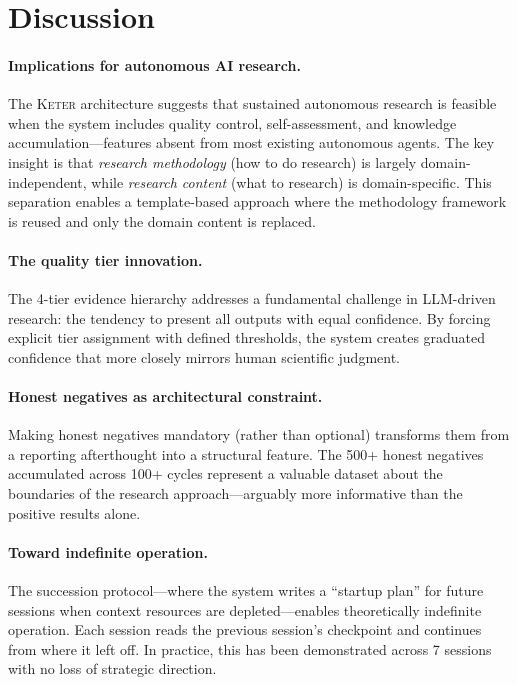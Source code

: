 \documentclass[11pt,a4paper]{article}
\newcommand{\keter}{\textsc{Keter}}
\begin{document}
\section{Discussion}
\label{sec:discussion}

\paragraph{Implications for autonomous AI research.}
The \keter{} architecture suggests that sustained autonomous research is feasible
when the system includes quality control, self-assessment, and knowledge
accumulation---features absent from most existing autonomous agents. The key
insight is that \emph{research methodology} (how to do research) is largely
domain-independent, while \emph{research content} (what to research) is
domain-specific. This separation enables a template-based approach where the
methodology framework is reused and only the domain content is replaced.

\paragraph{The quality tier innovation.}
The 4-tier evidence hierarchy addresses a fundamental challenge in LLM-driven
research: the tendency to present all outputs with equal confidence. By forcing
explicit tier assignment with defined thresholds, the system creates graduated
confidence that more closely mirrors human scientific judgment.

\paragraph{Honest negatives as architectural constraint.}
Making honest negatives mandatory (rather than optional) transforms them from
a reporting afterthought into a structural feature. The 500+ honest negatives
accumulated across 100+ cycles represent a valuable dataset about the boundaries
of the research approach---arguably more informative than the positive results
alone.

\paragraph{Toward indefinite operation.}
The succession protocol---where the system writes a ``startup plan'' for future
sessions when context resources are depleted---enables theoretically indefinite
operation. Each session reads the previous session's checkpoint and continues
from where it left off. In practice, this has been demonstrated across 7 sessions
with no loss of strategic direction.
\end{document}
